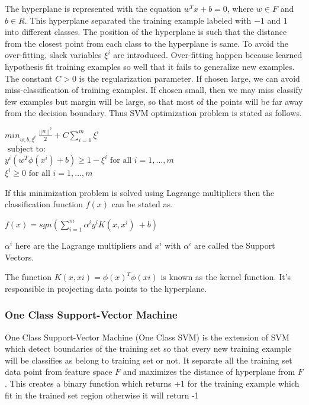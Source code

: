\documentclass[10pt,oneside,a4paper]{article}
\begin{document}
The hyperplane is represented with the equation $w^{T}x + b = 0$, where $w \in F$ and $b \in R$. This hyperplane separated the training example labeled with $-1$ and $1$ into different classes. The position of the hyperplane is such that the distance from the closest point from each class to the hyperplane is same. To avoid the over-fitting, slack variables $\xi^{i}$ are introduced. Over-fitting happen because learned hypothesis fit training examples so well that it fails to generalize new examples. The constant $C > 0$ is the regularization parameter. If chosen large, we can avoid miss-classification of training examples. If chosen small, then we may miss classify few examples but margin will be large, so that most of the points will be far away from the decision boundary. Thus SVM optimization problem is stated as follows.\cite{SVM} \cite{svm-ml}

\begin{center}
  ${min}_{w,b,\xi^i} \ \frac{||w||^2}{2} + C \sum_{i=1}^m \xi^i$ \\
  $\mbox{ subject to: }$ \\
  $y^i( w^T \phi(x^i) + b) \geq 1 - \xi^i \mbox{ for all } i = 1, \dots, m$ \\
  \hspace{3cm} $\xi^i \geq 0 \mbox{ for all } i = 1, \dots, m$ \\
\end{center}

If this minimization problem is solved using Lagrange multipliers then the classification function $f(x)$ can be stated as.

\begin{center}
$f(x)=sgn(\sum_{i=1}^m \alpha^i y^i K(x,x^i) \ + b)$
\end{center}

$\alpha^i$ here are the Lagrange multipliers and $x^i$ with $\alpha^i$ are called the Support Vectors.

The function $K(x,xi)=\phi(x)^T \phi(xi)$ is known as the kernel function. It's responsible in projecting data points to the hyperplane.

\subsubsection{One Class Support-Vector Machine}

One Class Support-Vector Machine (One Class SVM) is the extension of SVM which detect boundaries of the training set so that every new training example will be classifies as belong to training set or not. It separate all the training set data point from feature space $F$ and maximizes the distance of hyperplane from $F$. This creates a binary function which returns +1 for the training example which fit in the trained set region otherwise it will return -1
\end{document}
